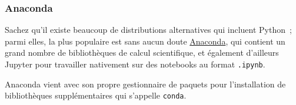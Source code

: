     \hypertarget{anaconda}{%
\subsubsection{Anaconda}\label{anaconda}}

    Sachez qu'il existe beaucoup de distributions alternatives qui incluent
Python~; parmi elles, la plus populaire est sans aucun doute
\href{https://www.anaconda.com/}{Anaconda}, qui contient un grand nombre
de bibliothèques de calcul scientifique, et également d'ailleurs Jupyter
pour travailler nativement sur des notebooks au format \texttt{.ipynb}.

Anaconda vient avec son propre gestionnaire de paquets pour
l'installation de bibliothèques supplémentaires qui s'appelle
\texttt{conda}.


    
    
    
